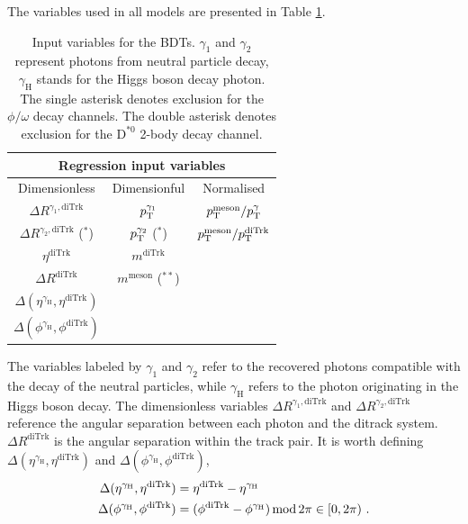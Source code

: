 The variables used in all models are presented in Table \ref{tab:model_variables}.
\begin{table}[!ht]
    \centering
    \begin{tabular}{|c|c|c|}
        \hline
        \multicolumn{3}{|c|}{\cellcolor{lightgray} Regression input variables} \\ \hline
        \cellcolor{lightgray}Dimensionless  &\cellcolor{lightgray}Dimensionful  &\cellcolor{lightgray}Normalised            \\\hline
        $\Delta R^{\gamma_1, \text{diTrk}}$             &$p_\text{T}^{\gamma_1}$           &$p_\text{T}^{\text{meson}}/p_\text{T}^{\gamma}$          \\
        $\Delta R^{\gamma_2, \text{diTrk}}$ ($^{*}$)   &$p_\text{T}^{\gamma_2}$ ($^{*}$) &$p_\text{T}^{\text{meson}}/p_\text{T}^{\text{diTrk}}$    \\
        $\eta^{\text{diTrk}}$                           &$m^{\text{diTrk}}$         &       \\
        $\Delta R^{\text{diTrk}}$                       &$m^{\text{meson}}$ ($^{**}$)  &       \\
        $\Delta(\eta^{\gamma_{\text{H}}}, \eta^{\text{diTrk}})$    & & \\
        $\Delta(\phi^{\gamma_{\text{H}}}, \phi^{\text{diTrk}})$    & & \\
        \hline
    \end{tabular}
    \caption{Input variables for the BDTs. $\gamma_1$ and $\gamma_2$ represent photons from neutral particle decay, $\gamma_{\text{H}}$ stands for the Higgs boson decay photon. The single asterisk denotes exclusion for the $\phi/\omega$ decay channels. The double asterisk denotes exclusion for the $\text{D}^{*0}$ 2-body decay channel.}
    \label{tab:model_variables}
\end{table}
The variables labeled by $\gamma_1$ and $\gamma_2$ refer to the recovered photons compatible with the decay of the neutral particles, while $\gamma_{\text{H}}$ refers to the photon originating in the Higgs boson decay. The dimensionless variables $\Delta R^{\gamma_1, \text{diTrk}}$ and $\Delta R^{\gamma_2, \text{diTrk}}$ reference the angular separation between each photon and the ditrack system. $\Delta R^{\text{diTrk}}$ is the angular separation within the track pair. It is worth defining $\Delta(\eta^{\gamma_{\text{H}}}, \eta^{\text{diTrk}})$ and $\Delta(\phi^{\gamma_{\text{H}}}, \phi^{\text{diTrk}})$,
\begin{equation*}
    \begin{aligned}
    \Delta(\eta^{\gamma_{\text{H}}}, \eta^{\text{diTrk}}) &= \eta^{\text{diTrk}} - \eta^{\gamma_{\text{H}}} \\
    \Delta(\phi^{\gamma_{\text{H}}}, \phi^{\text{diTrk}}) &= (\phi^{\text{diTrk}} - \phi^{\gamma_{\text{H}}}) \operatorname{mod} 2\pi \in[0, 2\pi)\ .
    \end{aligned}
\end{equation*}
